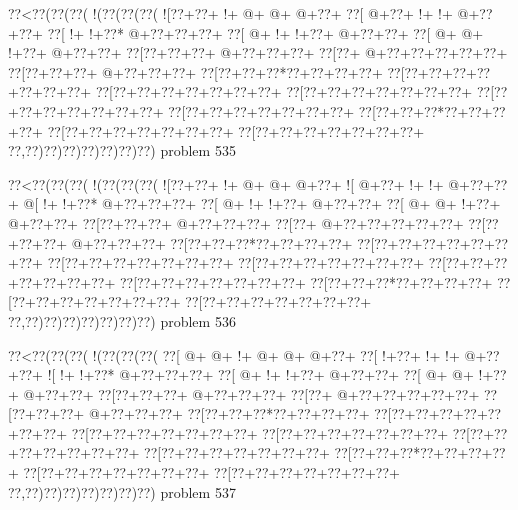 \vbox{\vbox{\goo
\0??<\0??(\0??(\0??(\- !(\0??(\0??(\0??(
\- ![\0??+\0??+\- !+\- @+\- @+\- @+\0??+
\0??[\- @+\0??+\- !+\- !+\- @+\0??+\0??+
\0??[\- !+\- !+\0??*\- @+\0??+\0??+\0??+
\0??[\- @+\- !+\- !+\0??+\- @+\0??+\0??+
\0??[\- @+\- @+\- !+\0??+\- @+\0??+\0??+
\0??[\0??+\0??+\0??+\- @+\0??+\0??+\0??+
\0??[\0??+\- @+\0??+\0??+\0??+\0??+\0??+
\0??[\0??+\0??+\0??+\- @+\0??+\0??+\0??+
\0??[\0??+\0??+\0??*\0??+\0??+\0??+\0??+
\0??[\0??+\0??+\0??+\0??+\0??+\0??+\0??+
\0??[\0??+\0??+\0??+\0??+\0??+\0??+\0??+
\0??[\0??+\0??+\0??+\0??+\0??+\0??+\0??+
\0??[\0??+\0??+\0??+\0??+\0??+\0??+\0??+
\0??[\0??+\0??+\0??+\0??+\0??+\0??+\0??+
\0??[\0??+\0??+\0??*\0??+\0??+\0??+\0??+
\0??[\0??+\0??+\0??+\0??+\0??+\0??+\0??+
\0??[\0??+\0??+\0??+\0??+\0??+\0??+\0??+
\0??,\0??)\0??)\0??)\0??)\0??)\0??)\0??)
}
\hfil problem 535\hfil\break
}

\vbox{\vbox{\goo
\0??<\0??(\0??(\0??(\- !(\0??(\0??(\0??(
\- ![\0??+\0??+\- !+\- @+\- @+\- @+\0??+
\- ![\- @+\0??+\- !+\- !+\- @+\0??+\0??+
\- @[\- !+\- !+\0??*\- @+\0??+\0??+\0??+
\0??[\- @+\- !+\- !+\0??+\- @+\0??+\0??+
\0??[\- @+\- @+\- !+\0??+\- @+\0??+\0??+
\0??[\0??+\0??+\0??+\- @+\0??+\0??+\0??+
\0??[\0??+\- @+\0??+\0??+\0??+\0??+\0??+
\0??[\0??+\0??+\0??+\- @+\0??+\0??+\0??+
\0??[\0??+\0??+\0??*\0??+\0??+\0??+\0??+
\0??[\0??+\0??+\0??+\0??+\0??+\0??+\0??+
\0??[\0??+\0??+\0??+\0??+\0??+\0??+\0??+
\0??[\0??+\0??+\0??+\0??+\0??+\0??+\0??+
\0??[\0??+\0??+\0??+\0??+\0??+\0??+\0??+
\0??[\0??+\0??+\0??+\0??+\0??+\0??+\0??+
\0??[\0??+\0??+\0??*\0??+\0??+\0??+\0??+
\0??[\0??+\0??+\0??+\0??+\0??+\0??+\0??+
\0??[\0??+\0??+\0??+\0??+\0??+\0??+\0??+
\0??,\0??)\0??)\0??)\0??)\0??)\0??)\0??)
}
\hfil problem 536\hfil\break
}

\vbox{\vbox{\goo
\0??<\0??(\0??(\0??(\- !(\0??(\0??(\0??(
\0??[\- @+\- @+\- !+\- @+\- @+\- @+\0??+
\0??[\- !+\0??+\- !+\- !+\- @+\0??+\0??+
\- ![\- !+\- !+\0??*\- @+\0??+\0??+\0??+
\0??[\- @+\- !+\- !+\0??+\- @+\0??+\0??+
\0??[\- @+\- @+\- !+\0??+\- @+\0??+\0??+
\0??[\0??+\0??+\0??+\- @+\0??+\0??+\0??+
\0??[\0??+\- @+\0??+\0??+\0??+\0??+\0??+
\0??[\0??+\0??+\0??+\- @+\0??+\0??+\0??+
\0??[\0??+\0??+\0??*\0??+\0??+\0??+\0??+
\0??[\0??+\0??+\0??+\0??+\0??+\0??+\0??+
\0??[\0??+\0??+\0??+\0??+\0??+\0??+\0??+
\0??[\0??+\0??+\0??+\0??+\0??+\0??+\0??+
\0??[\0??+\0??+\0??+\0??+\0??+\0??+\0??+
\0??[\0??+\0??+\0??+\0??+\0??+\0??+\0??+
\0??[\0??+\0??+\0??*\0??+\0??+\0??+\0??+
\0??[\0??+\0??+\0??+\0??+\0??+\0??+\0??+
\0??[\0??+\0??+\0??+\0??+\0??+\0??+\0??+
\0??,\0??)\0??)\0??)\0??)\0??)\0??)\0??)
}
\hfil problem 537\hfil\break
}

